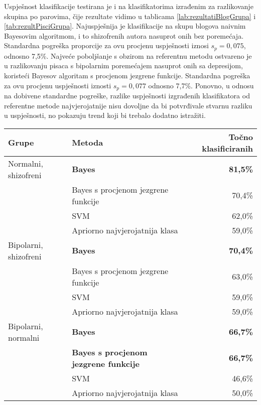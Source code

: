 \documentclass[10pt, a4paper]{article}
\begin{document}
Uspješnost klasifikacije testirana je i na klasifikatorima izrađenim za razlikovanje skupina po parovima, čije rezultate vidimo u tablicama \ref{lab:rezultatiBlogGrupa} i \ref{tab:rezultPisciGrupa}. Najuspješnija je klasifikacije na skupu blogova naivnim Bayesovim algoritmom, i to shizofrenih autora nasuprot onih bez poremećaja. Standardna pogreška proporcije za ovu procjenu uspješnosti iznosi $s_p = 0,075$, odnosno 7,5\%. Najveće poboljšanje s obzirom na referentnu metodu ostvareno je u razlikovanju pisaca s bipolarnim poremećajem nasuprot onih sa depresijom, koristeći Bayesov algoritam s procjenom jezgrene funkcije. Standardna pogreška za ovu procjenu uspješnosti iznosti $s_p = 0,077$ odnosno 7,7\%. Ponovno, u odnosu na dobivene standardne pogreške, razlike uspješnosti izgrađenih klasifikatora od referentne metode najvjerojatnije nisu dovoljne da bi potvrđivale stvarnu razliku u uspješnosti, no pokazuju trend koji bi trebalo dodatno istražiti.

\begin{table*}
\caption{Postotak točno klasificiranih primjera na skupu blogova po parovima klasa korištenjem različitih algoritama.}
\label{lab:rezultatiBlogGrupa}
\begin{center}
\begin{tabular}{llr}
\toprule
Grupe & Metoda & Točno klasificiranih\\
\midrule
Normalni, shizofreni & \textbf{Bayes} & \textbf{81,5\%}\\
 & Bayes s procjenom jezgrene funkcije & 70,4\%\\
 & SVM & 62,0\%\\
 & Apriorno najvjerojatnija klasa & 59,0\%\\
\midrule
 Bipolarni, shizofreni &   \textbf{Bayes} &   \textbf{70,4\%}\\
 & Bayes s procjenom jezgrene funkcije & 63,0\%\\
 & SVM & 59,0\%\\
 & Apriorno najvjerojatnija klasa & 59,0\%\\
\midrule
Bipolarni, normalni & \textbf{Bayes} &  \textbf{66,7\%}\\
 &  \textbf{Bayes s procjenom jezgrene funkcije} &  \textbf{66,7\%}\\
 & SVM & 46,6\%\\
 & Apriorno najvjerojatnija klasa & 50,0\%\\
 \bottomrule
 \end{tabular}
 \end{center}
 \end{table*}
\end{document}
